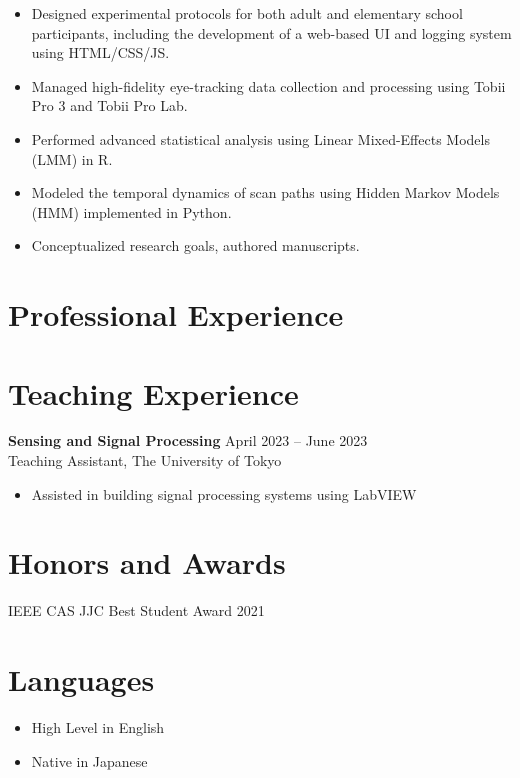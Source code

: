 \documentclass[letterpaper,10.5pt]{article}
\begin{document}
\begin{itemize}
  \item Designed experimental protocols for both adult and elementary school participants, including the development of a web-based UI and logging system using HTML/CSS/JS.
  \item Managed high-fidelity eye-tracking data collection and processing using Tobii Pro 3 and Tobii Pro Lab.
  \item Performed advanced statistical analysis using Linear Mixed-Effects Models (LMM) in R.
  \item Modeled the temporal dynamics of scan paths using Hidden Markov Models (HMM) implemented in Python.
  \item Conceptualized research goals, authored manuscripts.
\end{itemize}
\vspace{8pt}
\section*{Professional Experience}
\section*{Teaching Experience}
\textbf{Sensing and Signal Processing} \hfill April 2023 -- June 2023 \\
Teaching Assistant, The University of Tokyo \\
\begin{itemize}
  \item Assisted in building signal processing systems using LabVIEW
\end{itemize}\vspace{5pt}
\section*{Honors and Awards}
IEEE CAS JJC Best Student Award \hfill 2021 \\ 
\section*{Languages}
\begin{itemize}[leftmargin=15pt]
  \item High Level in English
  \item Native in Japanese
\end{itemize}\vspace{5pt}
\end{document}
